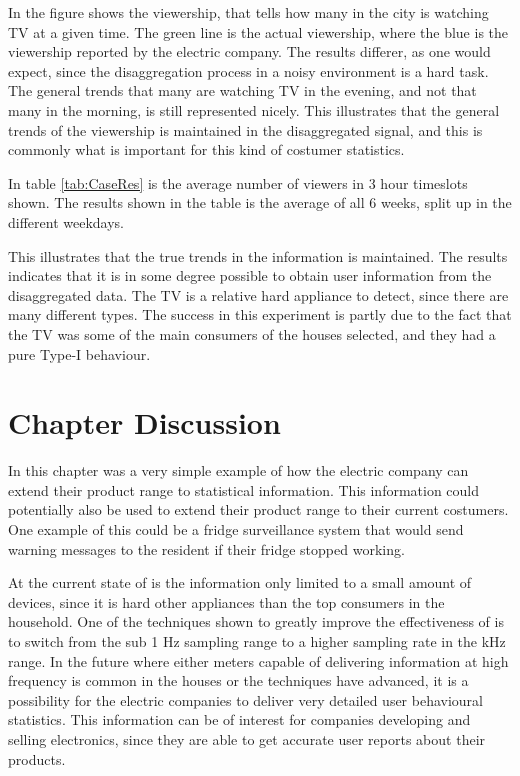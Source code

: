 In the figure shows the viewership, that tells how many in the city is watching TV at a given time. The green line is the actual viewership, where the blue is the viewership reported by the electric company. The results differer, as one would expect, since the disaggregation process in a noisy environment is a hard task. The general trends that many are watching TV in the evening, and not that many in the morning, is still represented nicely. This illustrates that the general trends of the viewership is maintained in the disaggregated signal, and this is commonly what is important for this kind of costumer statistics. 

In table \ref{tab:CaseRes} is the average number of viewers in 3 hour timeslots shown. The results shown in the table is the average of all 6 weeks, split up in the different weekdays. 



This illustrates that the true trends in the information is maintained. The results indicates that it is in some degree possible to obtain user information from the disaggregated data. The TV is a relative hard appliance to detect, since there are many different types. The success in this experiment is partly due to the fact that the TV was some of the main consumers of the houses selected, and they had a pure Type-I behaviour.

\section{Chapter Discussion}
In this chapter was a very simple example of how the electric company can extend their product range to statistical information. This information could potentially also be used to extend their product range to their current costumers. One example of this could be a fridge surveillance system that would send warning messages to the resident if their fridge stopped working.

At the current state of  is the information only limited to a small amount of devices, since it is hard other appliances than the top consumers in the household. One of the techniques shown to greatly improve the effectiveness of  is to switch from the sub 1 Hz sampling range to a higher sampling rate in the kHz range. In the future where either meters capable of delivering information at high frequency is common in the houses or the  techniques have advanced, it is a possibility for the electric companies to deliver very detailed user behavioural statistics. This information can be of interest for companies developing and selling electronics, since they are able to get accurate user reports about their products. 

